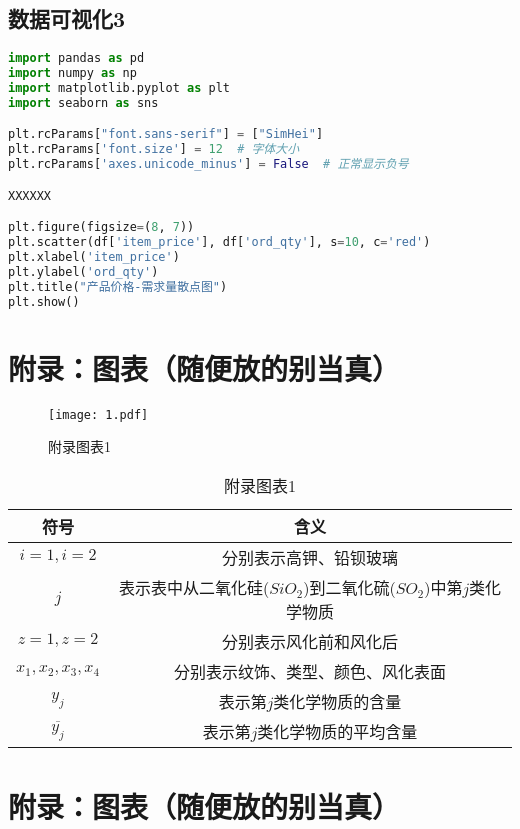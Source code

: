 \subsection{数据可视化3}


\begin{lstlisting}[language=Python]
import pandas as pd
import numpy as np
import matplotlib.pyplot as plt
import seaborn as sns

plt.rcParams["font.sans-serif"] = ["SimHei"]
plt.rcParams['font.size'] = 12  # 字体大小
plt.rcParams['axes.unicode_minus'] = False  # 正常显示负号

XXXXXX

plt.figure(figsize=(8, 7))
plt.scatter(df['item_price'], df['ord_qty'], s=10, c='red')
plt.xlabel('item_price')
plt.ylabel('ord_qty')
plt.title("产品价格-需求量散点图")
plt.show()
\end{lstlisting}


\section{附录：图表（随便放的别当真）}

\begin{figure}[H] 
	\centering 
	\texttt{[image: 1.pdf]} 
	\caption{附录图表1} 
	\label{fig3} 
\end{figure}


\begin{table}[H]
	\centering
	\caption{附录图表1}
	\begin{tabular}{c c}
		\toprule[1.5pt]
		符号 & 含义  \\ 
		\midrule[1pt]
		$i=1,i=2$ & 分别表示高钾、铅钡玻璃 \\ 
		$j$ & 表示表中从二氧化硅($SiO_2$)到二氧化硫($SO_2$)中第$j$类化学物质 \\
		$z=1,z=2$ & 分别表示风化前和风化后 \\
		$x_1,x_2,x_3,x_4$ & 分别表示纹饰、类型、颜色、风化表面 \\
		$y_j$ & 表示第$j$类化学物质的含量 \\ 
		$\overline{y_j}$ & 表示第$j$类化学物质的平均含量 \\  
		\toprule[1.5pt]
	\end{tabular}
\end{table} 


\section{附录：图表（随便放的别当真）}

